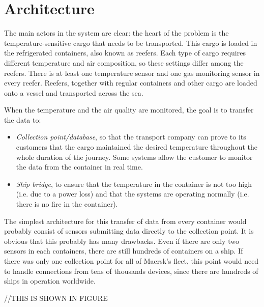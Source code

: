 \section{Architecture}

The main actors in the system are clear: the heart of the problem is the temperature-sensitive cargo that needs to be transported. This cargo is loaded in the refrigerated containers, also known as reefers. Each type of cargo requires different temperature and air composition, so these settings differ among the reefers. There is at least one temperature sensor and one gas monitoring sensor in every reefer. Reefers, together with regular containers and other cargo are loaded onto a vessel and transported across the sea.

When the temperature and the air quality are monitored, the goal is to transfer the data to:

\begin{itemize}
    \item \textit{Collection point/database}, so that the transport company can prove to its customers that the cargo maintained the desired temperature throughout the whole duration of the journey. Some systems allow the customer to monitor the data from the container in real time.
    \item \textit{Ship bridge}, to ensure that the temperature in the container is not too high (i.e. due to a power loss) and that the systems are operating normally (i.e. there is no fire in the container). 
\end{itemize}

The simplest architecture for this transfer of data from every container would probably consist of sensors submitting data directly to the collection point. It is obvious that this probably has many drawbacks. Even if there are only two sensors in each containers, there are still hundreds of containers on a ship. If there was only one collection point for all of Maersk’s fleet, this point would need to handle connections from tens of thousands devices, since there are hundreds of ships in operation worldwide.

//THIS IS SHOWN IN FIGURE

